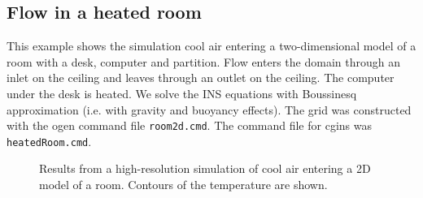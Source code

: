 \subsection{Flow in a heated room}\label{sec:heatedRoom}

This example shows the simulation cool air entering a two-dimensional model of a room
with a desk, computer and partition.
Flow enters the domain through an inlet on the ceiling and leaves through an outlet
on the ceiling. The computer under the desk is heated. We solve the INS equations with
Boussinesq approximation (i.e. with gravity and buoyancy effects). 
The grid was constructed with the ogen command file {\tt room2d.cmd}. The
command file for cgins was {\tt heatedRoom.cmd}.


{
\begin{figure}[hbt]
\newcommand{\figWidtha}{8cm}
\newcommand{\trimfig}[2]{\trimFig{#1}{#2}{0}{.0}{.33}{.325}}
\begin{center}
\end{center}
\caption{Results from a high-resolution simulation of cool air entering a 2D model of a room.
    Contours of the temperature are shown.}
\label{fig:room2dFlow}
\end{figure}
}



